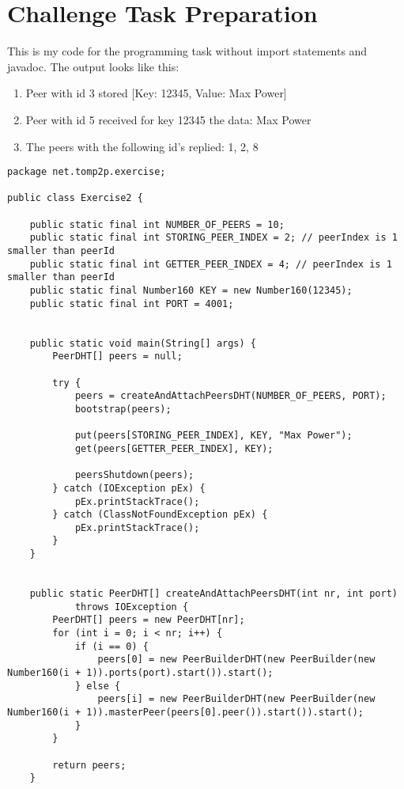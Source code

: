 \documentclass{article}
\begin{document}
\section{Challenge Task Preparation}
This is my code for the programming task without import statements and javadoc. The output looks like this: 
\begin{enumerate}[]
	\item Peer with id 3 stored [Key: 12345, Value: Max Power]
	\item Peer with id 5 received for key 12345 the data: Max Power
	\item The peers with the following id's replied: 1, 2, 8
\end{enumerate}

\begin{lstlisting}
package net.tomp2p.exercise;

public class Exercise2 {

    public static final int NUMBER_OF_PEERS = 10;
    public static final int STORING_PEER_INDEX = 2; // peerIndex is 1 smaller than peerId
    public static final int GETTER_PEER_INDEX = 4; // peerIndex is 1 smaller than peerId
    public static final Number160 KEY = new Number160(12345);
    public static final int PORT = 4001;


    public static void main(String[] args) {
        PeerDHT[] peers = null;

        try {
            peers = createAndAttachPeersDHT(NUMBER_OF_PEERS, PORT);
            bootstrap(peers);

            put(peers[STORING_PEER_INDEX], KEY, "Max Power");
            get(peers[GETTER_PEER_INDEX], KEY);

            peersShutdown(peers);
        } catch (IOException pEx) {
            pEx.printStackTrace();
        } catch (ClassNotFoundException pEx) {
            pEx.printStackTrace();
        }
    }


    public static PeerDHT[] createAndAttachPeersDHT(int nr, int port)
            throws IOException {
        PeerDHT[] peers = new PeerDHT[nr];
        for (int i = 0; i < nr; i++) {
            if (i == 0) {
                peers[0] = new PeerBuilderDHT(new PeerBuilder(new Number160(i + 1)).ports(port).start()).start();
            } else {
                peers[i] = new PeerBuilderDHT(new PeerBuilder(new Number160(i + 1)).masterPeer(peers[0].peer()).start()).start();
            }
        }

        return peers;
    }



\end{lstlisting}
\end{document}
